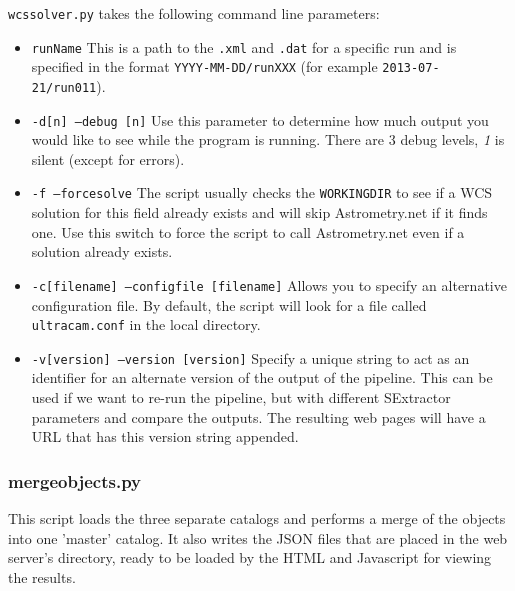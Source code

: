 \texttt{wcssolver.py} takes the following command line parameters:
\begin{itemize}
  \item \texttt{runName} This is a path to the \texttt{.xml} and \texttt{.dat} for a specific run and is specified in the format \texttt{YYYY-MM-DD/runXXX}  (for example \texttt{2013-07-21/run011}).
  \item \texttt{-d[n] --debug [n]} Use this parameter to determine how much output you would like to see while the program is running. There are 3 debug levels, \emph{1} is silent (except for errors).
  \item \texttt{-f --forcesolve} The script usually checks the \texttt{WORKINGDIR} to see if a WCS solution for this field already exists and will skip Astrometry.net if it finds one. Use this switch to force the script to call Astrometry.net even if a solution already exists.
  \item \texttt{-c[filename] --configfile [filename]} Allows you to specify an alternative configuration file. By default, the script will look for a file called \texttt{ultracam.conf} in the local directory. 
  \item \texttt{-v[version] --version [version]} Specify a unique string to act as an identifier for an alternate version of the output of the pipeline. This can be used if we want to re-run the pipeline, but with different SExtractor parameters and compare the outputs. The resulting web pages will have a URL that has this version string appended.    
\end{itemize}

\subsubsection{mergeobjects.py}
This script loads the three separate catalogs and performs a merge of the objects into one 'master' catalog. It also writes the JSON files that are placed in the web server's directory, ready to be loaded by the HTML and Javascript for viewing the results. 

